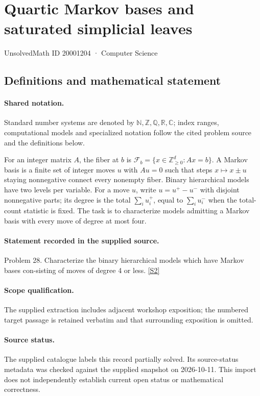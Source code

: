 \documentclass[11pt]{article}
\newcommand{\sref}[2]{\hyperlink{source:#1:#2}{[S#2]}}
\begin{document}
\setcounter{section}{20001203}
\section{Quartic Markov bases and saturated simplicial leaves}\label{20001204}
{\small\sffamily UnsolvedMath ID 20001204 · Computer Science}
\subsection{Definitions and mathematical statement}

\paragraph{Shared notation.}Standard number systems are denoted by $\mathbb N,\mathbb Z,\mathbb Q,\mathbb R,\mathbb C$; index ranges, computational models and specialized notation follow the cited problem source and the definitions below.


For an integer matrix $A$, the fiber at $b$ is $\mathcal F_b=\{x\in\mathbb Z_{\ge0}^d:Ax=b\}$. A Markov basis is a finite set of integer moves $u$ with $Au=0$ such that steps $x\mapsto x\pm u$ staying nonnegative connect every nonempty fiber. Binary hierarchical models have two levels per variable. For a move $u$, write $u=u^+-u^-$ with disjoint nonnegative parts; its degree is the total $\sum_i u_i^+$, equal to $\sum_i u_i^-$ when the total-count statistic is fixed. The task is to characterize models admitting a Markov basis with every move of degree at most four.
\paragraph{Statement recorded in the supplied source.}
Problem 28. Characterize the binary hierarchical models which have Markov bases con-sisting of moves of degree 4 or less. \sref{20001204}{2}
\paragraph{Scope qualification.}
The supplied extraction includes adjacent workshop exposition; the numbered target passage is retained verbatim and that surrounding exposition is omitted.
\paragraph{Source status.}
The supplied catalogue labels this record partially solved. Its source-status metadata was checked against the supplied snapshot on 2026-10-11. This import does not independently establish current open status or mathematical correctness.
\end{document}
